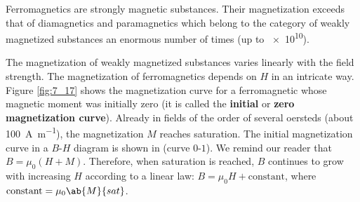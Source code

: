 Ferromagnetics are strongly magnetic substances.
Their magnetization exceeds that of diamagnetics and paramagnetics which belong to the category of weakly magnetized substances an enormous number of times (up to \num{e10}).

The magnetization of weakly magnetized substances varies linearly with the field strength.
The magnetization of ferromagnetics depends on $H$ in an intricate way.
Figure \ref{fig:7_17} shows the magnetization curve for a ferromagnetic whose magnetic moment was initially zero (it is called the \textbf{initial} or \textbf{zero magnetization curve}).
Already in fields of the order of several oersteds (about \SI{100}{\ampere\per\metre}), the magnetization $M$ reaches saturation.
The initial magnetization curve in a $B$-$H$ diagram is shown in  (curve $0$-$1$).
We remind our reader that $B=\mu_0(H+M)$.
Therefore, when saturation is reached, $B$ continues to grow with increasing $H$ according to a linear law: $B=\mu_0H+\text{constant}$, where $\text{constant}=\mu_0\ab{M}{sat}$.

